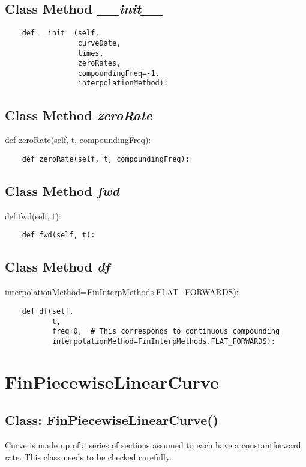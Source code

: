 \documentclass[twoside,11pt]{book}
\begin{document}
\subsection{Class Method {\it \_\_init\_\_}}


\begin{lstlisting}
    def __init__(self, 
                 curveDate, 
                 times, 
                 zeroRates, 
                 compoundingFreq=-1, 
                 interpolationMethod):
\end{lstlisting}

\subsection{Class Method {\it zeroRate}}
def zeroRate(self, t, compoundingFreq):

\begin{lstlisting}
    def zeroRate(self, t, compoundingFreq):
\end{lstlisting}

\subsection{Class Method {\it fwd}}
def fwd(self, t):

\begin{lstlisting}
    def fwd(self, t):
\end{lstlisting}

\subsection{Class Method {\it df}}
interpolationMethod=FinInterpMethods.FLAT\_FORWARDS):

\begin{lstlisting}
    def df(self,
           t,
           freq=0,  # This corresponds to continuous compounding
           interpolationMethod=FinInterpMethods.FLAT_FORWARDS):
\end{lstlisting}

\newpage
\section{FinPiecewiseLinearCurve}

\subsection{Class: FinPiecewiseLinearCurve()}
Curve is made up of a series of sections assumed to each have a constantforward rate. This class needs to be checked carefully. 
\end{document}
